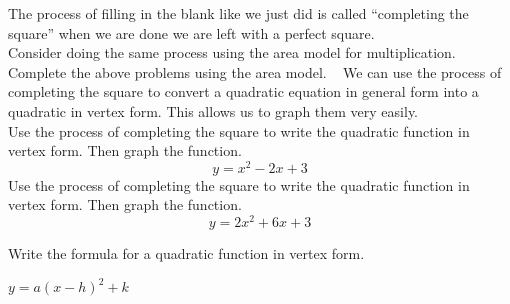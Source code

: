 \documentclass[12pt,fleqn]{book}
\newcommand{\prb}[1]{\begin{Exercise}#1\end{Exercise}}
\newcommand{\sol}[1]{\begin{Answer}#1\end{Answer}}
\begin{document}
The process of filling in the blank like we just did is called ``completing the square'' when we are done we are left with a perfect square.
\\[1em]
Consider doing the same process using the area model for multiplication.  Complete the above problems using the area model.
\clearpage
\
\clearpage
We can use the process of completing the square to convert a quadratic equation in general form into a quadratic in vertex form.  This allows us to graph them very easily.
\\[1em]
Use the process of completing the square to write the quadratic function in vertex form. Then graph the function.
\[y=x^2-2x+3\]
\vfill
Use the process of completing the square to write the quadratic function in vertex form. Then graph the function.
\[y=2x^2+6x+3\]
\vfill
\clearpage
\prb{Write the formula for a quadratic function in vertex form.}
\sol{$y=a(x-h)^2+k$}
\end{document}
